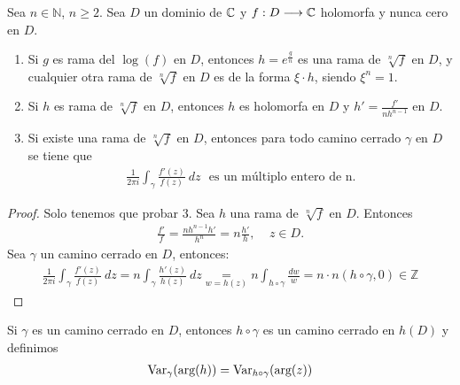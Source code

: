 \begin{teo}[Recopilatorio]
    Sea $n \in \mathbb{N}$, $n \ge 2$. Sea $D$ un dominio de $\mathbb{C}$ y $f:D \longrightarrow \mathbb{C}$ holomorfa y nunca cero en $D$.
    \begin{enumerate}
        \item Si $g$ es rama del $\log(f)$ en $D$, entonces $h = e^{\frac{g}{n}}$ es una rama de $\sqrt[n]{f}$ en $D$, y cualquier otra rama de $\sqrt[n]{f}$ en $D$ es de la forma $\xi \cdot h$, siendo $\xi^n = 1$.
        \item Si $h$ es rama de $\sqrt[n]{f}$ en $D$, entonces $h$ es holomorfa en $D$ y $h' = \frac{f'}{nh^{n-1}}$ en $D$.
        \item Si existe una rama de $\sqrt[n]{f}$ en $D$, entonces para todo camino cerrado $\gamma$ en $D$ se tiene que
              \begin{align*}
                  \frac{1}{2\pi i} \int_{\gamma} \frac{f'(z)}{f(z)} \ dz \ \ \ \text{es un múltiplo entero de n}.
              \end{align*}
    \end{enumerate}
\end{teo}

\begin{proof}
    Solo tenemos que probar $3$. Sea $h$ una rama de $\sqrt[n]{f}$ en $D$. Entonces
    \begin{align*}
        \frac{f'}{f} = \frac{nh^{n-1}h'}{h^{n}} = n\frac{h'}{h}, \ \ \ \ \ z \in D.
    \end{align*}
    Sea $\gamma$ un camino cerrado en $D$, entonces:
    \begin{align*}
        \frac{1}{2\pi i} \int_{\gamma} \frac{f'(z)}{f(z)} \ dz = n\int_{\gamma} \frac{h'(z)}{h(z)} \ dz \underset{w = h(z)}{=} n \int_{h \circ \gamma} \frac{dw}{w} = n \cdot n(h \circ \gamma, 0) \in \mathbb{Z}
    \end{align*}
\end{proof}

\begin{obs}
    Si $\gamma$ es un camino cerrado en $D$, entonces $h \circ \gamma$ es un camino cerrado en $h(D)$ y definimos
    \begin{align*}
        \text{Var}_{\gamma}(\text{arg}(h)) = \text{Var}_{h \circ \gamma}(\text{arg}(z))
    \end{align*}
\end{obs}

